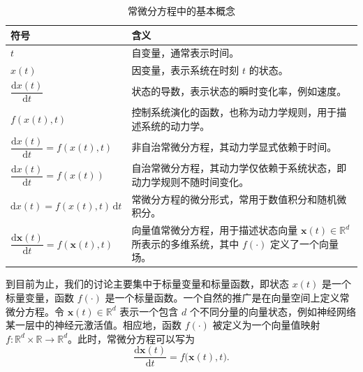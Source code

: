 \begin{table}[htbp]
    \centering
    \renewcommand{\arraystretch}{1.35}
    \setlength{\tabcolsep}{8pt}
    \begin{tabularx}{0.88\textwidth}{
        >{\raggedleft\arraybackslash}p{}
        |
        >{\raggedright\arraybackslash}X
    }
        \toprule
        \textbf{符号} & \textbf{含义} \\
        \midrule

        \(t\)
        &
        自变量，通常表示时间。
        \\

        \(x(t)\)
        &
        因变量，表示系统在时刻 \(t\) 的状态。
        \\

        \(\dfrac{\mathrm{d}x(t)}{\mathrm{d}t}\)
        &
        状态的导数，表示状态的瞬时变化率，例如速度。
        \\

        \(f(x(t),t)\)
        &
        控制系统演化的函数，也称为动力学规则，用于描述系统的动力学。
        \\

        \(\dfrac{\mathrm{d}x(t)}{\mathrm{d}t}
        =f(x(t),t)\)
        &
        非自治常微分方程，其动力学显式依赖于时间。
        \\

        \(\dfrac{\mathrm{d}x(t)}{\mathrm{d}t}
        =f(x(t))\)
        &
        自治常微分方程，其动力学仅依赖于系统状态，即动力学规则不随时间变化。
        \\

        \(\mathrm{d}x(t)
        =f(x(t),t)\,\mathrm{d}t\)
        &
        常微分方程的微分形式，常用于数值积分和随机微积分。
        \\

        \(\dfrac{\mathrm{d}\boldsymbol{x}(t)}{\mathrm{d}t}
        =f(\boldsymbol{x}(t),t)\)
        &
        向量值常微分方程，用于描述状态向量
        \(\boldsymbol{x}(t)\in\mathbb{R}^{d}\)
        所表示的多维系统，其中 \(f(\cdot)\) 定义了一个向量场。
        \\

        \bottomrule
    \end{tabularx}
    \caption{常微分方程中的基本概念}
    \label{tab:basic-ode-concepts}
\end{table}

到目前为止，我们的讨论主要集中于标量变量和标量函数，即状态 \(x(t)\) 是一个标量变量，函数 \(f(\cdot)\) 是一个标量函数。一个自然的推广是在向量空间上定义常微分方程。令 \(\boldsymbol{x}(t)\in\mathbb{R}^{d}\) 表示一个包含 \(d\) 个不同分量的向量状态，例如神经网络某一层中的神经元激活值。相应地，函数 \(f(\cdot)\) 被定义为一个向量值映射 \(f:\mathbb{R}^{d}\times\mathbb{R}\rightarrow\mathbb{R}^{d}\)。此时，常微分方程可以写为
\begin{equation}
\frac{\mathrm{d}\boldsymbol{x}(t)}{\mathrm{d}t}
=
f\bigl(\boldsymbol{x}(t),t\bigr).
\label{eq:vector-valued-ode}
\end{equation}

